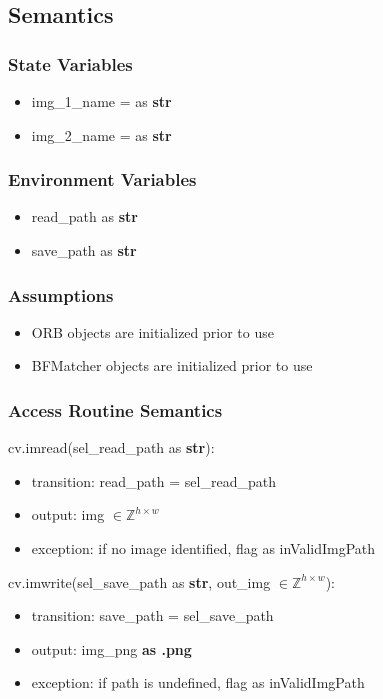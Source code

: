 \documentclass[12pt, titlepage]{article}
\begin{document}
\subsection{Semantics}

\subsubsection{State Variables}
\begin{itemize}
\item img\_1\_name = as \textbf{str}
\item img\_2\_name = as \textbf{str}
\end{itemize}

\subsubsection{Environment Variables}
\begin{itemize}
  \item read\_path as \textbf{str}
  \item save\_path as \textbf{str}
\end{itemize}

\subsubsection{Assumptions}
\begin{itemize}
  \item ORB objects are initialized prior to use
  \item BFMatcher objects are initialized prior to use
\end{itemize}

\subsubsection{Access Routine Semantics}

\noindent cv.imread(sel\_read\_path as \textbf{str}):
\begin{itemize}
\item transition: read\_path = sel\_read\_path
\item output: img $\in \mathbb{Z}^{h \times w}$
\item exception: if no image identified, flag as inValidImgPath 
\end{itemize}

\noindent cv.imwrite(sel\_save\_path as \textbf{str}, out\_img 
$\in \mathbb{Z}^{h \times w}$):
\begin{itemize}
\item transition: save\_path = sel\_save\_path
\item output: img\_png \textbf{as .png}
\item exception: if path is undefined, flag as inValidImgPath 
\end{itemize}
\end{document}

